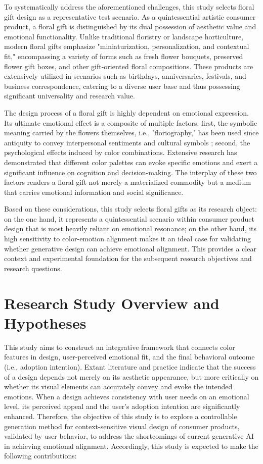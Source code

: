 To systematically address the aforementioned challenges, this study selects floral gift design as a representative test scenario. As a quintessential artistic consumer product, a floral gift is distinguished by its dual possession of aesthetic value and emotional functionality. Unlike traditional floristry or landscape horticulture, modern floral gifts emphasize "miniaturization, personalization, and contextual fit," encompassing a variety of forms such as fresh flower bouquets, preserved flower gift boxes, and other gift-oriented floral compositions. These products are extensively utilized in scenarios such as birthdays, anniversaries, festivals, and business correspondence, catering to a diverse user base and thus possessing significant universality and research value.

The design process of a floral gift is highly dependent on emotional expression. Its ultimate emotional effect is a composite of multiple factors: first, the symbolic meaning carried by the flowers themselves, i.e., "floriography," has been used since antiquity to convey interpersonal sentiments and cultural symbols \cite{dietzCompleteLanguageFlowers2022,JiaJunZhiWuYiXiangYanJiu2011}; second, the psychological effects induced by color combinations. Extensive research has demonstrated that different color palettes can evoke specific emotions and exert a significant influence on cognition and decision-making. The interplay of these two factors renders a floral gift not merely a materialized commodity but a medium that carries emotional information and social significance.

Based on these considerations, this study selects floral gifts as its research object: on the one hand, it represents a quintessential scenario within consumer product design that is most heavily reliant on emotional resonance; on the other hand, its high sensitivity to color-emotion alignment makes it an ideal case for validating whether generative design can achieve emotional alignment. This provides a clear context and experimental foundation for the subsequent research objectives and research questions.

\section{Research Study Overview and Hypotheses}

This study aims to construct an integrative framework that connects color features in design, user-perceived emotional fit, and the final behavioral outcome (i.e., adoption intention). Extant literature and practice indicate that the success of a design depends not merely on its aesthetic appearance, but more critically on whether its visual elements can accurately convey and evoke the intended emotions. When a design achieves consistency with user needs on an emotional level, its perceived appeal and the user's adoption intention are significantly enhanced. Therefore, the objective of this study is to explore a controllable generation method for context-sensitive visual design of consumer products, validated by user behavior, to address the shortcomings of current generative AI in achieving emotional alignment. Accordingly, this study is expected to make the following contributions:


